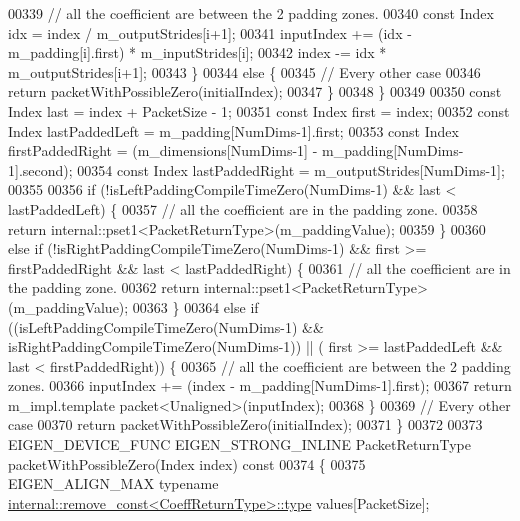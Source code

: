 \begin{DoxyCode}
00339         \textcolor{comment}{// all the coefficient are between the 2 padding zones.}
00340         \textcolor{keyword}{const} Index idx = index / m\_outputStrides[i+1];
00341         inputIndex += (idx - m\_padding[i].first) * m\_inputStrides[i];
00342         index -= idx * m\_outputStrides[i+1];
00343       \}
00344       \textcolor{keywordflow}{else} \{
00345         \textcolor{comment}{// Every other case}
00346         \textcolor{keywordflow}{return} packetWithPossibleZero(initialIndex);
00347       \}
00348     \}
00349 
00350     \textcolor{keyword}{const} Index last = index + PacketSize - 1;
00351     \textcolor{keyword}{const} Index first = index;
00352     \textcolor{keyword}{const} Index lastPaddedLeft = m\_padding[NumDims-1].first;
00353     \textcolor{keyword}{const} Index firstPaddedRight = (m\_dimensions[NumDims-1] - m\_padding[NumDims-1].second);
00354     \textcolor{keyword}{const} Index lastPaddedRight = m\_outputStrides[NumDims-1];
00355 
00356     \textcolor{keywordflow}{if} (!isLeftPaddingCompileTimeZero(NumDims-1) && last < lastPaddedLeft) \{
00357       \textcolor{comment}{// all the coefficient are in the padding zone.}
00358       \textcolor{keywordflow}{return} internal::pset1<PacketReturnType>(m\_paddingValue);
00359     \}
00360     \textcolor{keywordflow}{else} \textcolor{keywordflow}{if} (!isRightPaddingCompileTimeZero(NumDims-1) && first >= firstPaddedRight && last < 
      lastPaddedRight) \{
00361       \textcolor{comment}{// all the coefficient are in the padding zone.}
00362       \textcolor{keywordflow}{return} internal::pset1<PacketReturnType>(m\_paddingValue);
00363     \}
00364     \textcolor{keywordflow}{else} \textcolor{keywordflow}{if} ((isLeftPaddingCompileTimeZero(NumDims-1) && isRightPaddingCompileTimeZero(NumDims-1)) || (
      first >= lastPaddedLeft && last < firstPaddedRight)) \{
00365       \textcolor{comment}{// all the coefficient are between the 2 padding zones.}
00366       inputIndex += (index - m\_padding[NumDims-1].first);
00367       \textcolor{keywordflow}{return} m\_impl.template packet<Unaligned>(inputIndex);
00368     \}
00369     \textcolor{comment}{// Every other case}
00370     \textcolor{keywordflow}{return} packetWithPossibleZero(initialIndex);
00371   \}
00372 
00373   EIGEN\_DEVICE\_FUNC EIGEN\_STRONG\_INLINE PacketReturnType packetWithPossibleZero(Index index)\textcolor{keyword}{ const}
00374 \textcolor{keyword}{  }\{
00375     EIGEN\_ALIGN\_MAX \textcolor{keyword}{typename} \hyperlink{group___sparse_core___module}{internal::remove\_const<CoeffReturnType>::type}
       values[PacketSize];

\end{DoxyCode}
